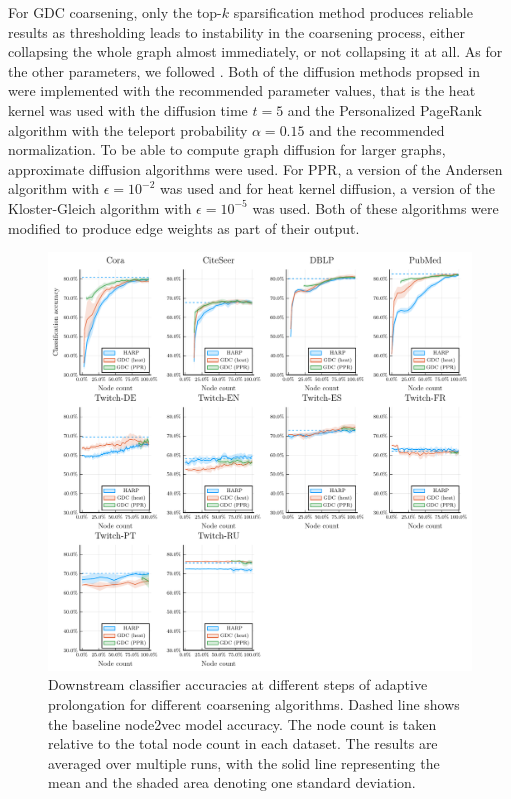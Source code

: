 For GDC coarsening, only the top-\( k \) sparsification method produces reliable results as thresholding leads to instability in the coarsening process, either collapsing the whole graph almost immediately, or not collapsing it at all. As for the other parameters, we followed \cite{gasteiger_diffusion_2019}. Both of the diffusion methods propsed in \cite{gasteiger_diffusion_2019} were implemented with the recommended parameter values, that is the heat kernel was used with the diffusion time \( t = 5 \) and the Personalized PageRank algorithm with the teleport probability \( \alpha = 0.15 \) and the recommended normalization. To be able to compute graph diffusion for larger graphs, approximate diffusion algorithms were used. For PPR, a version of the Andersen algorithm \cite{andersen_local_2006} with \( \epsilon = 10^{-2} \) was used and for heat kernel diffusion, a version of the Kloster-Gleich algorithm \cite{kloster_heat_2014} with \( \epsilon = 10^{-5} \) was used. Both of these algorithms were modified to produce edge weights as part of their output.

\begin{figure}
  \centering
  \includegraphics[width=\linewidth]{images/coarsening-algorithms/coarsening-algorithms.pdf}
  \caption{Downstream classifier accuracies at different steps of adaptive prolongation for different coarsening algorithms. Dashed line shows the baseline node2vec model accuracy. The node count is taken relative to the total node count in each dataset. The results are averaged over multiple runs, with the solid line representing the mean and the shaded area denoting one standard deviation.}
  \label{fig:coarsening-algorithms}
\end{figure}

